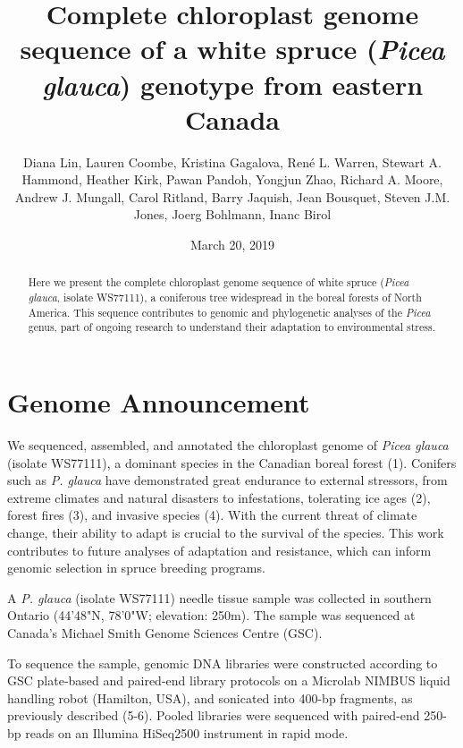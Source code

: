 \documentclass[titlepage,11pt, oneside]{article}   	%
\title{\textbf{Complete chloroplast genome sequence of a white spruce (\textit{Picea glauca}) genotype from eastern Canada}}
\author{Diana Lin, Lauren Coombe, Kristina Gagalova, Ren\'{e} L. Warren, Stewart A. Hammond, Heather Kirk, Pawan Pandoh, Yongjun Zhao, Richard A. Moore, Andrew J. Mungall, Carol Ritland, Barry Jaquish, Jean Bousquet, Steven J.M. Jones, Joerg Bohlmann, Inanc Birol}
\date{March 20, 2019}					%
\begin{document}
\maketitle
\begin{abstract}

Here we present the complete chloroplast genome sequence of white spruce (\textit{Picea glauca}, isolate WS77111), a coniferous tree widespread in the boreal forests of North America. This sequence contributes to genomic and phylogenetic analyses of the \textit{Picea} genus, part of ongoing research to understand their adaptation to environmental stress.

\end{abstract}

\section*{Genome Announcement}
We sequenced, assembled, and annotated the chloroplast genome of \textit{Picea glauca} (isolate WS77111), a dominant species in the Canadian boreal forest (1). Conifers such as \textit{P. glauca} have demonstrated great endurance to external stressors, from extreme climates and natural disasters to infestations, tolerating ice ages (2), forest fires (3), and invasive species (4). With the current threat of climate change, their ability to adapt is crucial to the survival of the species. This work contributes to future analyses of adaptation and resistance, which can inform genomic selection in spruce breeding programs.
\newline
\par
A \textit{P. glauca} (isolate WS77111) needle tissue sample was collected in southern Ontario (44'48"N, 78'0"W; elevation: 250m). The sample was sequenced at Canada’s Michael Smith Genome Sciences Centre (GSC).
\newline
\par
To sequence the sample, genomic DNA libraries were constructed according to GSC plate-based and paired-end library protocols on a Microlab NIMBUS liquid handling robot (Hamilton, USA), and sonicated into 400-bp fragments, as previously described (5-6). Pooled libraries were sequenced with paired-end 250-bp reads on an Illumina HiSeq2500 instrument in rapid mode.
\newline
\par
\end{document}
